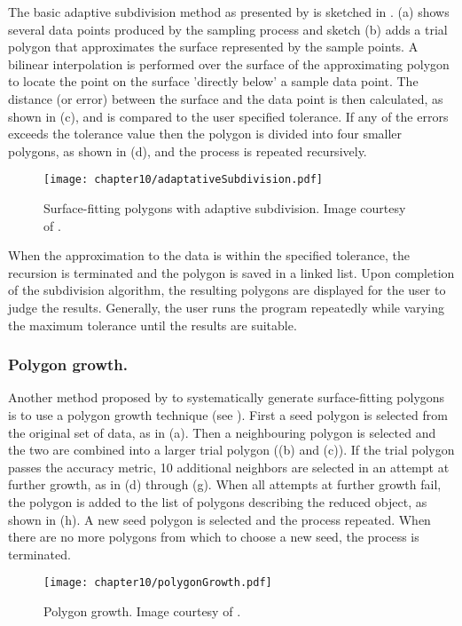 The basic adaptive subdivision method as presented by \cite{Schmitt86} is sketched in . (a) shows several data points produced by the sampling process and sketch (b) adds a trial polygon that approximates the surface represented by the sample points. A bilinear interpolation is performed over the surface of the approximating polygon to locate the point on the surface 'directly below' a sample data point. The distance (or error) between the surface and the data point is then calculated, as shown in (c), and is compared to the user specified tolerance. If any of the errors exceeds the tolerance value then the polygon is divided into four smaller polygons, as shown in (d), and the process is repeated recursively. 
%
\begin{figure}
\centering
\texttt{[image: chapter10/adaptativeSubdivision.pdf]}
\caption[Surface-fitting polygons with adaptive subdivision]{Surface-fitting polygons with adaptive subdivision. Image courtesy of \cite{Schmitt86}.}
\label{chap10:fig-adaptativeSubdivision}
\end{figure}

When the approximation to the data is within the specified tolerance, the recursion is terminated and the polygon is saved in a linked list. Upon completion of the subdivision algorithm, the resulting polygons are displayed for the user to judge the results. Generally, the user runs the program repeatedly while varying the maximum tolerance until the results are suitable.

\subsubsection*{Polygon growth.}
Another method proposed by \cite{Dehaemer91} to systematically generate surface-fitting polygons is to use a polygon growth technique (see ). First a seed polygon is selected from the original set of data, as in (a). Then a neighbouring polygon is selected and the two are combined into a larger trial polygon ((b) and (c)). If the trial polygon passes the accuracy metric, 10 additional neighbors are selected in an attempt at further growth, as in (d) through (g). When all attempts at further growth fail, the polygon is added to the list of polygons describing the reduced object, as shown in (h). A new seed polygon is selected and the process repeated. When there are no more polygons from which to choose a new seed, the process is terminated.
%
\begin{figure}
\centering
\texttt{[image: chapter10/polygonGrowth.pdf]}
\caption[Polygon growth]{Polygon growth. Image courtesy of \cite{Dehaemer91}.}
\label{chap10:fig-polygonGrowth}
\end{figure}

